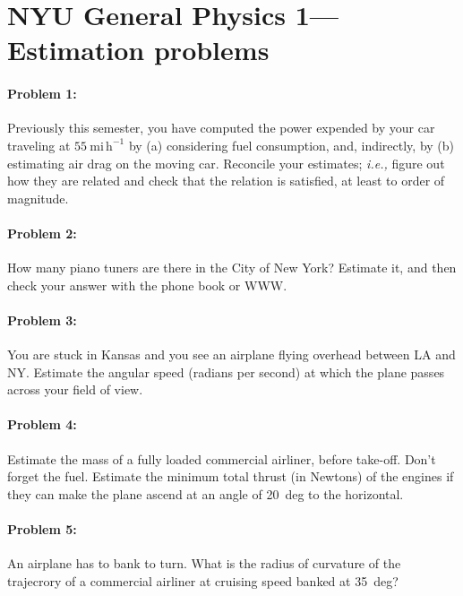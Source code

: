 \documentclass[12pt]{article}
\begin{document}
\thispagestyle{empty}

\section*{NYU General Physics 1---Estimation problems}

\paragraph{Problem 1:}

Previously this semester, you have computed the power expended by your
car traveling at $55~\mathrm{mi\,h^{-1}}$ by (a) considering fuel
consumption, and, indirectly, by (b) estimating air drag on the moving
car.  Reconcile your estimates; \textit{i.e.,} figure out how they are
related and check that the relation is satisfied, at least to order of
magnitude.

\paragraph{Problem 2:}

How many piano tuners are there in the City of New York?  Estimate
it, and then check your answer with the phone book or WWW.

\paragraph{Problem 3:}

You are stuck in Kansas and you see an airplane flying overhead
between LA and NY.  Estimate the angular speed (radians per second) at
which the plane passes across your field of view.

\paragraph{Problem 4:}

Estimate the mass of a fully loaded commercial airliner, before
take-off.  Don't forget the fuel.  Estimate the minimum total thrust
(in Newtons) of the engines if they can make the plane ascend at an
angle of 20~deg to the horizontal.

\paragraph{Problem 5:}

An airplane has to bank to turn.  What is the radius of curvature of
the trajecrory of a commercial airliner at cruising speed banked at
35~deg?
\end{document}
